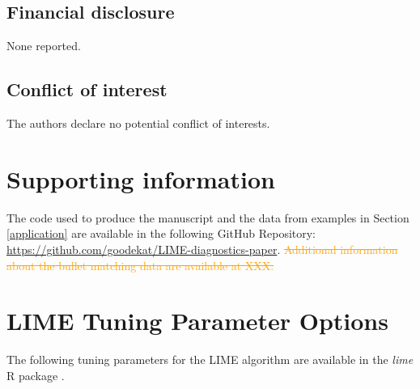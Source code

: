 \documentclass[AMS,STIX2COL]{WileyNJD-v2}\usepackage[]{graphicx}\usepackage[]{color}
\newcommand{\hh}[1]{\textcolor{orange}{#1}}
\begin{document}
\subsection*{Financial disclosure}

None reported.

\subsection*{Conflict of interest}

The authors declare no potential conflict of interests.

\section*{Supporting information}

The code used to produce the manuscript and the data from examples in Section \ref{application} are available in the following GitHub Repository: \href{https://github.com/goodekat/LIME-diagnostics-paper}{https://github.com/goodekat/LIME-diagnostics-paper}. \hh{\sout{ Additional information about the bullet matching data are available at XXX.}}



\newpage

\appendix

\section{LIME Tuning Parameter Options} \label{lime-details}

The following tuning parameters for the LIME algorithm are available in the \emph{lime} R package \citep{pedersen:2020}.
\end{document}
